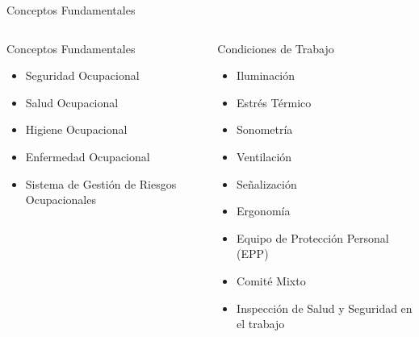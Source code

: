 \documentclass[spanish]{beamer} %
\begin{document}
\begin{frame}{Conceptos Fundamentales}

  \begin{columns}[T] %
    \begin{column}{0.5\textwidth}
      Conceptos Fundamentales
      \begin{itemize}
          \item Seguridad Ocupacional
          \item Salud Ocupacional
          \item Higiene Ocupacional
          \item Enfermedad Ocupacional
          \item Sistema de Gestión de Riesgos Ocupacionales
      \end{itemize}
    \end{column}
    \begin{column}{0.5\textwidth}
      Condiciones de Trabajo
      \begin{itemize}
          \item Iluminación
          \item Estrés Térmico
          \item Sonometría
          \item Ventilación
          \item Señalización
          \item Ergonomía
          \item Equipo de Protección Personal (EPP)
          \item Comité Mixto
          \item Inspección de Salud y Seguridad en el trabajo
      \end{itemize}
    \end{column}
  \end{columns}
  
\end{frame}
\end{document}
